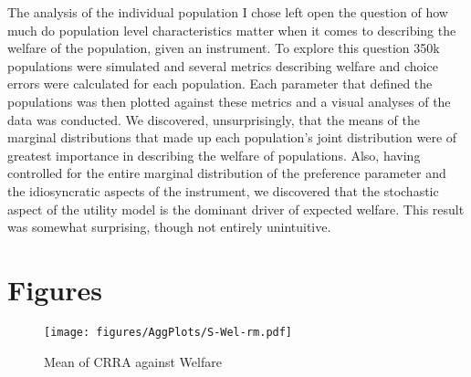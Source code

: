 \documentclass[../main.tex]{subfiles}
\begin{document}
The analysis of the individual population I chose left open the question of how much do population level characteristics matter when it comes to describing the welfare of the population, given an instrument.
To explore this question 350k populations were simulated and several metrics describing welfare and choice errors were calculated for each population.
Each parameter that defined the populations was then plotted against these metrics and a visual analyses of the data was conducted.
We discovered, unsurprisingly, that the means of the marginal distributions that made up each population's joint distribution were of greatest importance in describing the welfare of populations.
Also, having controlled for the entire marginal distribution of the preference parameter and the idiosyncratic aspects of the instrument, we discovered that the stochastic aspect of the utility model is the dominant driver of expected welfare.
This result was somewhat surprising, though not entirely unintuitive.




\newpage

\section{Figures}

\begin{figure}[hp!]
	\center
	\caption{Mean of CRRA against Welfare}
	\texttt{[image: figures/AggPlots/S-Wel-rm.pdf]}
	\label{fig:S-Wel-rm}
\end{figure}
\end{document}
